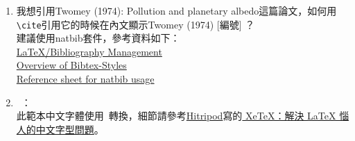 \begin{enumerate}[leftmargin=0pt, topsep=0pt, itemsep=0pt, label=\Roman{*}.]
\begin{enumerate}[topsep=0pt, itemsep=0pt, label=$\bullet$]
    \begin{verbatim}
\RequirePackage[top=3cm,left=3cm,bottom=2cm,right=3cm]{geometry}
    \end{verbatim}
    \item 我想引用Twomey (1974): Pollution and planetary albedo這篇論文，如何用\texttt{\textbackslash cite}引用它的時候在內文顯示Twomey (1974) [編號] ？\\
    建議使用natbib套件，參考資料如下：\\
    \href{http://en.wikibooks.org/wiki/LaTeX/Bibliography_Management}{LaTeX/Bibliography Management}\\
    \href{http://nodonn.tipido.net/bibstyle.php}{Overview of Bibtex-Styles}\\
    \href{http://merkel.zoneo.net/Latex/natbib.php}{Reference sheet for natbib usage }\\
 \item \XeTeX\ ：\\
    此範本中文字體使用\XeTeX\ 轉換，細節請參考\href{http://www.hitripod.com/blog/}{Hitripod}寫的\href{http://www.hitripod.com/blog/2011/04/xetex-chinese-font-cjk-latex/}{ 
XeTeX：解決 LaTeX 惱人的中文字型問題}。
    \end{enumerate} 
    \end{enumerate} 


